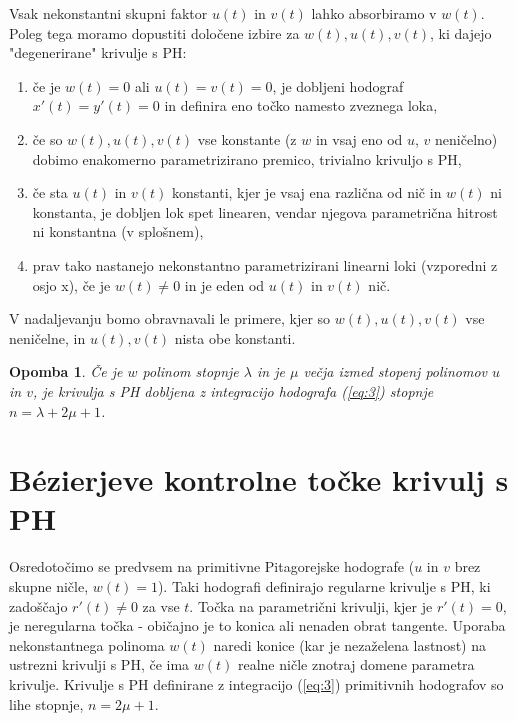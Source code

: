 \documentclass[a4paper]{IEEEtran}
\newtheorem{remark}{Opomba}
\begin{document}
	Vsak nekonstantni skupni faktor $u (t)$ in $v (t)$ lahko absorbiramo v $w (t)$. Poleg tega moramo dopustiti določene izbire za $w (t), u (t), v (t)$, ki dajejo "degenerirane" krivulje s PH:
	\begin{enumerate}
		\item če je $w (t) = 0$ ali $u (t) = v (t) = 0$, je dobljeni hodograf $x\prime (t) = y\prime (t) = 0$ in definira eno točko namesto zveznega loka,
		\item če so $w (t), u (t), v (t)$ vse konstante (z $w$ in vsaj eno od $u$, $v$ neničelno) dobimo enakomerno parametrizirano premico, trivialno krivuljo s PH,
		\item če sta $u (t)$ in $v (t)$ konstanti, kjer je vsaj ena različna od nič in $w (t)$ ni konstanta, je dobljen lok spet linearen, vendar njegova parametrična hitrost ni konstantna (v splošnem),
		\item prav tako nastanejo nekonstantno parametrizirani linearni loki (vzporedni z osjo x), če je $w (t)\not = 0$ in je eden od $u (t)$ in $v (t)$ nič.
	\end{enumerate}
	V nadaljevanju bomo obravnavali le primere, kjer so $w (t), u (t), v (t)$ vse neničelne,
	in $u (t), v (t)$ nista obe konstanti.
	\begin{remark}
		Če je $w$ polinom stopnje $\lambda$ in je $\mu$ večja izmed stopenj polinomov $u$ in $v$, je krivulja s PH dobljena z integracijo hodografa (\ref{eq:3}) stopnje $n = \lambda + 2\mu+ 1$.
	\end{remark}

	\section{B\'ezierjeve kontrolne točke krivulj s PH}
	Osredotočimo se predvsem na primitivne Pitagorejske hodografe ($u$ in $v$ brez skupne ničle, $w(t)=1$). Taki hodografi definirajo regularne krivulje s PH, ki zadoščajo $r\prime (t)\not = 0$ za vse $t$. Točka na parametrični krivulji, kjer je $r\prime (t)=0$, je neregularna točka - običajno je to konica ali nenaden obrat tangente. Uporaba nekonstantnega polinoma $w (t)$ naredi konice (kar je nezaželena lastnost) na ustrezni krivulji s PH, če ima $w (t)$ realne ničle znotraj domene parametra krivulje. Krivulje s PH definirane z integracijo (\ref{eq:3}) primitivnih hodografov so lihe stopnje, $n = 2\mu + 1$.
	
\end{document}
